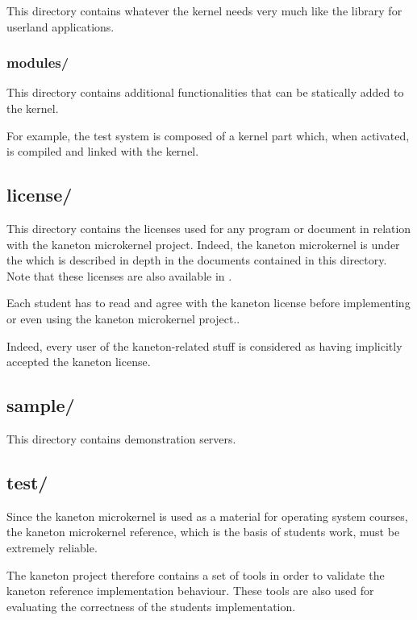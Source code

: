 This directory contains whatever the kernel needs \ie{} very much like
the  library for userland applications.


\subsubsection*{modules/}

This directory contains additional functionalities that can be statically
added to the kernel.

For example, the test system is composed of a kernel part which, when activated,
is compiled and linked with the kernel.

%
%

\subsection*{license/}

This directory contains the licenses used for any program or document
in relation with the kaneton microkernel project. Indeed, the kaneton
microkernel is under the  which is described in
depth in the documents contained in this directory. Note that these licenses
are also available in .

Each student has to read and agree with the kaneton license before
implementing or even using the kaneton microkernel project..

Indeed, every user of the kaneton-related stuff is considered as having
implicitly accepted the kaneton license.

%
%

\subsection*{sample/}

This directory contains demonstration servers.

%
%

\subsection*{test/}

Since the kaneton microkernel is used as a material for operating system
courses, the kaneton microkernel reference, which is the basis of students
work, must be extremely reliable.

The kaneton project therefore contains a set of tools in order to validate
the kaneton reference implementation behaviour. These tools are also used
for evaluating the correctness of the students implementation.

